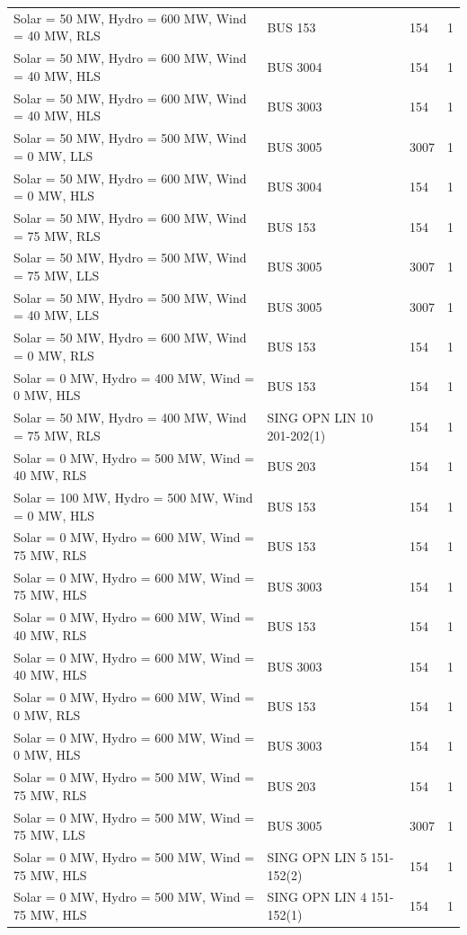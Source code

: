 \documentclass[10pt]{report}
\begin{document}
\begin{table}[H]
{\begin{tabular}{llp{8cm}r}
Solar = 50 MW, Hydro = 600 MW, Wind = 40 MW, RLS & BUS 153 & 154 & 1 \\
Solar = 50 MW, Hydro = 600 MW, Wind = 40 MW, HLS & BUS 3004 & 154 & 1 \\
Solar = 50 MW, Hydro = 600 MW, Wind = 40 MW, HLS & BUS 3003 & 154 & 1 \\
Solar = 50 MW, Hydro = 500 MW, Wind = 0 MW, LLS & BUS 3005 & 3007 & 1 \\
Solar = 50 MW, Hydro = 600 MW, Wind = 0 MW, HLS & BUS 3004 & 154 & 1 \\
Solar = 50 MW, Hydro = 600 MW, Wind = 75 MW, RLS & BUS 153 & 154 & 1 \\
Solar = 50 MW, Hydro = 500 MW, Wind = 75 MW, LLS & BUS 3005 & 3007 & 1 \\
Solar = 50 MW, Hydro = 500 MW, Wind = 40 MW, LLS & BUS 3005 & 3007 & 1 \\
Solar = 50 MW, Hydro = 600 MW, Wind = 0 MW, RLS & BUS 153 & 154 & 1 \\
Solar = 0 MW, Hydro = 400 MW, Wind = 0 MW, HLS & BUS 153 & 154 & 1 \\
Solar = 50 MW, Hydro = 400 MW, Wind = 75 MW, RLS & SING OPN LIN   10 201-202(1) & 154 & 1 \\
Solar = 0 MW, Hydro = 500 MW, Wind = 40 MW, RLS & BUS 203 & 154 & 1 \\
Solar = 100 MW, Hydro = 500 MW, Wind = 0 MW, HLS & BUS 153 & 154 & 1 \\
Solar = 0 MW, Hydro = 600 MW, Wind = 75 MW, RLS & BUS 153 & 154 & 1 \\
Solar = 0 MW, Hydro = 600 MW, Wind = 75 MW, HLS & BUS 3003 & 154 & 1 \\
Solar = 0 MW, Hydro = 600 MW, Wind = 40 MW, RLS & BUS 153 & 154 & 1 \\
Solar = 0 MW, Hydro = 600 MW, Wind = 40 MW, HLS & BUS 3003 & 154 & 1 \\
Solar = 0 MW, Hydro = 600 MW, Wind = 0 MW, RLS & BUS 153 & 154 & 1 \\
Solar = 0 MW, Hydro = 600 MW, Wind = 0 MW, HLS & BUS 3003 & 154 & 1 \\
Solar = 0 MW, Hydro = 500 MW, Wind = 75 MW, RLS & BUS 203 & 154 & 1 \\
Solar = 0 MW, Hydro = 500 MW, Wind = 75 MW, LLS & BUS 3005 & 3007 & 1 \\
Solar = 0 MW, Hydro = 500 MW, Wind = 75 MW, HLS & SING OPN LIN   5 151-152(2) & 154 & 1 \\
Solar = 0 MW, Hydro = 500 MW, Wind = 75 MW, HLS & SING OPN LIN   4 151-152(1) & 154 & 1 \\

\end{tabular}}
\end{table}
\end{document}
